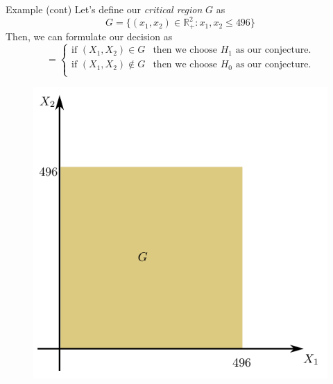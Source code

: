\documentclass{beamer}
\begin{document}
\begin{frame}{Example (cont)}
	Let's define our \textit{critical region} $G$ as 
	\begin{equation*}
		G=\{(x_1,x_2)\in \mathbb{R}^2_+: x_1,x_2 \le 496\}
	\end{equation*}
	Then, we can formulate our decision as
	\begin{equation*}
		=
		\begin{cases}
			\text{if }(X_1,X_2) \in G & \text{then we choose $H_1$ as our conjecture}.\\
			\text{if }(X_1,X_2) \notin G & \text{then we choose $H_0$ as our conjecture}.\\
		\end{cases}	
		\end{equation*}
	\begin{figure}[h]
	\centering
	\includegraphics[scale=0.4]{../../Figures/fig_hypo_test_region.png}
\end{figure}		
	
	
\end{frame}
\end{document}
